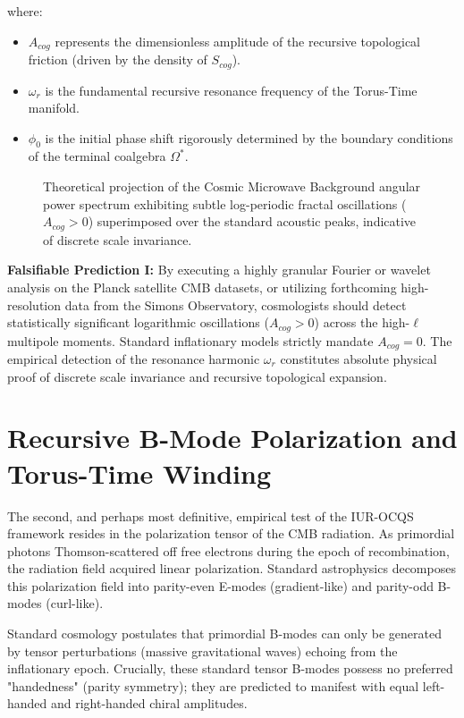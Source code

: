 \documentclass[12pt,openany]{book}
\begin{document}
where:
\begin{itemize}
    \item $A_{cog}$ represents the dimensionless amplitude of the recursive topological friction (driven by the density of $S_{cog}$).
    \item $\omega_r$ is the fundamental recursive resonance frequency of the Torus-Time manifold.
    \item $\phi_0$ is the initial phase shift rigorously determined by the boundary conditions of the terminal coalgebra $\Omega^*$.
\end{itemize}

\begin{figure}[h]
    \centering
    \caption{Theoretical projection of the Cosmic Microwave Background angular power spectrum exhibiting subtle log-periodic fractal oscillations ($A_{cog} > 0$) superimposed over the standard acoustic peaks, indicative of discrete scale invariance.}
    \label{fig:cmb_oscillation}
\end{figure}

\textbf{Falsifiable Prediction I:} By executing a highly granular Fourier or wavelet analysis on the Planck satellite CMB datasets, or utilizing forthcoming high-resolution data from the Simons Observatory, cosmologists should detect statistically significant logarithmic oscillations ($A_{cog} > 0$) across the high-$\ell$ multipole moments. Standard inflationary models strictly mandate $A_{cog} = 0$. The empirical detection of the resonance harmonic $\omega_r$ constitutes absolute physical proof of discrete scale invariance and recursive topological expansion.

\section{Recursive B-Mode Polarization and Torus-Time Winding}
The second, and perhaps most definitive, empirical test of the IUR-OCQS framework resides in the polarization tensor of the CMB radiation. As primordial photons Thomson-scattered off free electrons during the epoch of recombination, the radiation field acquired linear polarization. Standard astrophysics decomposes this polarization field into parity-even E-modes (gradient-like) and parity-odd B-modes (curl-like). 

Standard cosmology postulates that primordial B-modes can only be generated by tensor perturbations (massive gravitational waves) echoing from the inflationary epoch. Crucially, these standard tensor B-modes possess no preferred "handedness" (parity symmetry); they are predicted to manifest with equal left-handed and right-handed chiral amplitudes.
\end{document}
